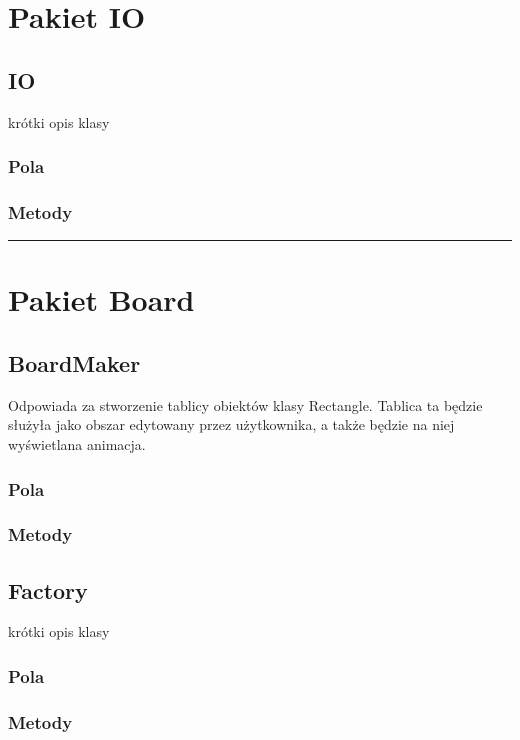 \documentclass[a4paper,11pt]{article}
\newcommand{\linia}{\rule{\linewidth}{0.4mm}}
\begin{document}
\section{Pakiet IO}
\subsection{IO}
krótki opis klasy
\subsubsection{Pola}

\subsubsection{Metody}



\noindent\linia

\section{Pakiet Board}

\subsection{BoardMaker}
Odpowiada za stworzenie tablicy obiektów klasy Rectangle. Tablica ta będzie służyła jako obszar edytowany przez użytkownika, a także będzie na niej wyświetlana animacja.
\subsubsection{Pola}

\subsubsection{Metody}




\subsection{Factory}
krótki opis klasy
\subsubsection{Pola}

\subsubsection{Metody}
\end{document}
